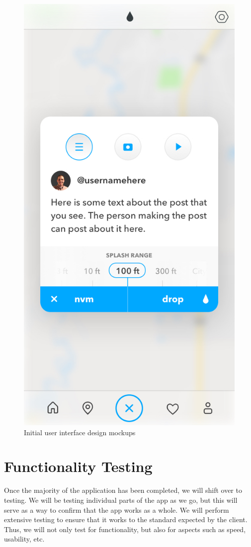 \documentclass[draftclsnofoot, onecolumn,journal,letterpaper,10pt, compsoc]{IEEEtran}
\begin{document}
\begin{figure}[!htb]
    \includegraphics[scale=.25]{new_droplet.jpg}
    \caption{Initial user interface design mockups}
    \label{fig:my_label}
\end{figure}

\section{Functionality Testing}
Once the majority of the application has been completed, we will shift over to testing. We will be testing individual parts of the app as we go, but this will serve as a way to confirm that the app works as a whole. We will perform extensive testing to ensure that it works to the standard expected by the client. Thus, we will not only test for functionality, but also for aspects such as speed, usability, etc. 
\end{document}
